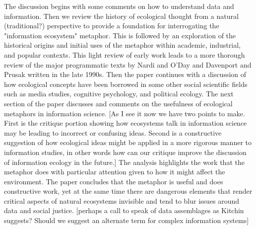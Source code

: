 The discussion begins with some comments on how to understand data and information. Then we review the history of ecological thought from a natural (traditional?) perspective to provide a foundation for interrogating the "information ecosystem" metaphor. This is followed by an exploration of the historical origins and initial uses of the metaphor within academic, industrial, and popular contexts. This light review of early work leads to a more thorough review of the major programmatic texts by Nardi and O'Day and Davenport and Prusak written in the late 1990s. Then the paper continues with a discussion of how ecological concepts have been borrowed in some other social scientific fields such as media studies, cognitive psychology, and political ecology. The next section of the paper discusses and comments on the usefulness of ecological metaphors in information science. [As I see it now we have two points to make. First is the critique portion showing how ecosystems talk in information science may be leading to incorrect or confusing ideas. Second is a constructive suggestion of how ecological ideas might be applied in a more rigorous manner to information studies, in other words how can our critique improve the discussion of information ecology in the future.] The analysis highlights the work that the metaphor does with particular attention given to how it might affect the environment. The paper concludes that the metaphor is useful and does constructive work, yet at the same time there are dangerous elements that render critical aspects of natural ecosystems invisible and tend to blur issues around data and social justice. [perhaps a call to speak of data assemblages as Kitchin suggests? Should we suggest an alternate term for complex information systems]
